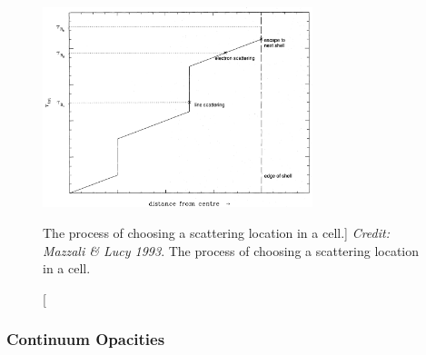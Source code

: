 \begin{figure}
\centering
\includegraphics[width=0.7\textwidth]{figures/03-radtrans/tau_scat.png}
\caption
[The process of choosing a scattering location in a cell.]
{
{\sl Credit: Mazzali \& Lucy 1993}. 
The process of choosing a scattering location in a cell.
} 
\label{fig:scatter_ml93}
\end{figure}

\subsubsection{Continuum Opacities}

